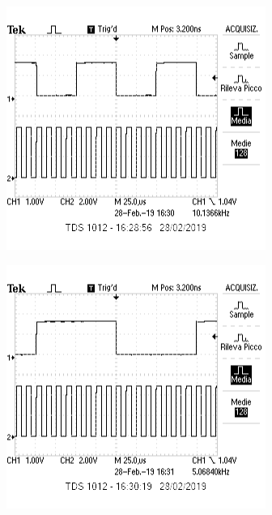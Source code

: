 \documentclass{article}
\begin{document}
	\begin{minipage}{.5\linewidth}
		\centering
		\includegraphics[width=\linewidth]{immagini/f1_8}
		\label{fig:f1_8}
	\end{minipage}
	\begin{minipage}{.5\linewidth}
		\centering
		\includegraphics[width=\linewidth]{immagini/f1_16}
		\label{fig:f1_16}
	\end{minipage}\newline\newline
\end{document}
